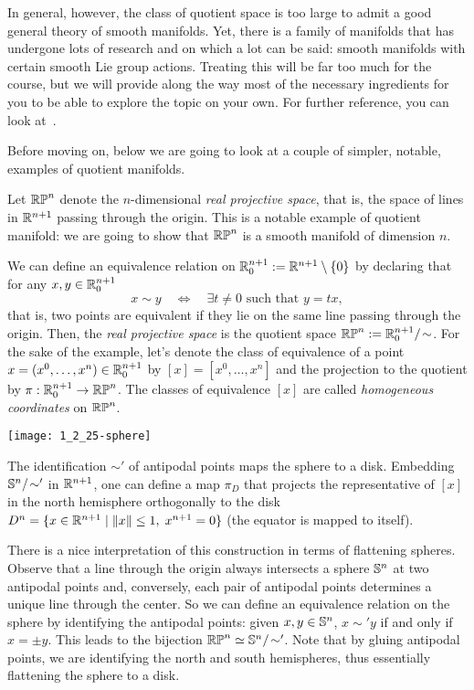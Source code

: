 In general, however, the class of quotient space is too large to admit a good general theory of smooth manifolds.
Yet, there is a family of manifolds that has undergone lots of research and on which a lot can be said: smooth manifolds with certain smooth Lie group actions.
Treating this will be far too much for the course, but we will provide along the way most of the necessary ingredients for you to be able to explore the topic on your own.
For further reference, you can look at~\cite[Chapter 21]{book:lee}.

Before moving on, below we are going to look at a couple of simpler, notable, examples of quotient manifolds.

\begin{example}
  Let $\mathbb{RP}^n$ denote the $n$-dimensional \emph{real projective space}, that is, the space of lines in $\mathbb{R}^{n+1}$ passing through the origin.
  This is a notable example of quotient manifold: we are going to show that $\mathbb{RP}^n$ is a smooth manifold of dimension $n$.

  We can define an equivalence relation on $\mathbb{R}^{n+1}_0:=\mathbb{R}^{n+1}\setminus\{0\}$ by declaring that for any $x,y\in \mathbb{R}^{n+1}_0$
  \begin{equation}
    x\sim y \quad\Longleftrightarrow\quad \exists t\neq 0 \mbox{ such that } y=tx,
  \end{equation}
  that is, two points are equivalent if they lie on the same line passing through the origin.
  Then, the \emph{real projective space} is the quotient space $\mathbb{RP}^n := \mathbb{R}^{n+1}_0/\!\sim$.
  For the sake of the example, let's denote the class of equivalence of a point $x=(x^0,\ldots,x^n)\in\mathbb{R}^{n+1}_0$ by $[x]=[x^0,\ldots,x^n]$ and the projection to the quotient by $\pi:\mathbb{R}^{n+1}_0\to\mathbb{RP}^n$.
  The classes of equivalence $[x]$ are called \emph{homogeneous coordinates} on $\mathbb{RP}^n$.

  \begin{marginfigure}
    \texttt{[image: 1\_2\_25-sphere]}
    \caption{The identification $\sim'$ of antipodal points maps the sphere to a disk. Embedding $\mathbb{S}^n/\!\sim'$ in $\mathbb{R}^{n+1}$, one can define a map $\pi_D$ that projects the representative of $[x]$ in the north hemisphere orthogonally to the disk $D^n = \{x\in\mathbb{R}^{n+1} \mid \|x\|\leq 1, \; x^{n+1}=0\}$ (the equator is mapped to itself). }
  \end{marginfigure}
  There is a nice interpretation of this construction in terms of flattening spheres.
  Observe that a line through the origin always intersects a sphere $\mathbb{S}^n$ at two antipodal points and, conversely, each pair of antipodal points determines a unique line through the center.
  So we can define an equivalence relation on the sphere by identifying the antipodal points: given $x,y\in\mathbb{S}^n$, $x\sim' y$ if and only if $x = \pm y$.
  This leads to the bijection $\mathbb{RP}^n \simeq \mathbb{S}^n/\!\sim'$.
  Note that by gluing antipodal points, we are identifying the north and south hemispheres, thus essentially flattening the sphere to a disk.


\end{example}

